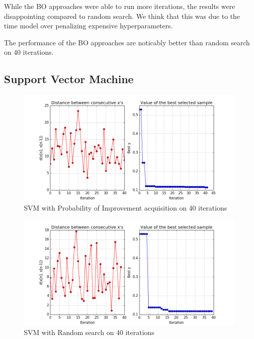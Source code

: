 \documentclass[letterpaper]{article}
\begin{document}
While the BO approaches were able to run more iterations, the results were disappointing compared to random search.
We think that this was due to the time model over penalizing expensive hyperparameters.

The performance of the BO approaches are noticably better than random search on 40 iterations.

\vfill\eject
\subsection {Support Vector Machine}
\begin{figure}[h]
	\includegraphics[width=\linewidth]{EIX_SVM_X_init2_NC_ITER40.png}
	\caption{SVM with Probability of Improvement acquisition on 40 iterations}
\end{figure}
\begin{figure}[h]
	\includegraphics[width=\linewidth]{RAND_SVM_X_init2_NC_ITER40.png}
	\caption{SVM with Random search on 40 iterations}
\end{figure}
\end{document}
